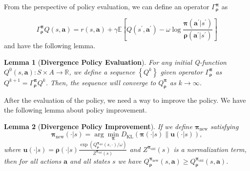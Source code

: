 \documentclass{article}
\newtheorem{lemma}{Lemma}
\begin{document}
From the perspective of policy evaluation, we can define an operator $\Gamma^{\operatorname{\bm{\pi}}}_{\operatorname{\bm{\rho}}}$ as
\iffalse
\begin{equation*}
	\Gamma^{\operatorname{\bm{\pi}}}_{\operatorname{\bm{\rho}}} Q(s,\bm{a}) = r(s,\bm{a}) + \gamma \mathbb{E}_{s^{\prime} \sim P(\cdot | s, \bm{a}), \bm{a^{\prime}} \sim  \bm{\pi}(\cdot | s^{\prime}) } \left[ Q(s^{\prime},\bm{a^{\prime}}) - \omega \log \frac{{\bm{\pi}}(\bm{a^{\prime}}|s^{\prime})}{{\bm{\rho}}(\bm{a^{\prime}}|s^{\prime})} \right]
\end{equation*}
\fi
\begin{equation*}
	\Gamma^{\operatorname{\bm{\pi}}}_{\operatorname{\bm{\rho}}} Q(s,\bm{a}) = r(s,\bm{a}) + \gamma \mathbb{E} \left[ Q(s^{\prime},\bm{a^{\prime}}) - \omega \log \frac{{\bm{\pi}}(\bm{a^{\prime}}|s^{\prime})}{{\bm{\rho}}(\bm{a^{\prime}}|s^{\prime})} \right]
\end{equation*}
and have the following lemma. 

\begin{lemma}[{\bf Divergence Policy Evaluation}] \label{policy_evaluation}
	For any initial Q-function $Q^{0}(s,\bm{a}): S \times A \to \mathbb{R} $, we define a sequence $\left\{ Q^{k} \right\}$ given operator $\Gamma^{\operatorname{\bm{\pi}}}_{\operatorname{\bm{\rho}}}$ as 
	$
	Q^{k +1} = \Gamma^{\operatorname{\bm{\pi}}}_{\operatorname{\bm{\rho}}} Q^{k}
	$.
	Then, the sequence will converge to $Q_{\bm{\rho}}^{\bm{\pi}}$ as $k \to \infty$.
\end{lemma}

After the evaluation of the policy, we need a way to improve the policy. We have the following lemma about policy improvement.

\begin{lemma}[{\bf Divergence Policy Improvement}] \label{policy-theorem}
	If we define ${\bm{\pi}}_{\operatorname{new}}$ satisfying
	\begin{equation}\label{eq:lemma2}
		{\bm{\pi}}_{\operatorname{new}}(\cdot|s) = \arg \min_{\bm{\pi}} D_{\operatorname{KL}}\left( {\bm{\pi}}(\cdot|s) \| \bm{u}(\cdot|s) \right),
	\end{equation}
	where $\bm{u}(\cdot|s) = {\bm{\rho}}(\cdot|s) \frac{\exp\left( Q^{{\bm{\pi}}_{\operatorname{old}}}_{\bm{\rho}}(s,\cdot) / \omega \right)}{Z^{{\bm{\pi}}_{\operatorname{old}}}(s)}$ and $Z^{{\bm{\pi}}_{\operatorname{old}}}(s)$ is a normalization term, then for all actions $\bm{a}$ and all states $s$ we have
	$Q^{{\bm{\pi}}_{\operatorname{new}}}_{\bm{\rho}}(s,\bm{a}) \geq Q^{{\bm{\pi}}_{\operatorname{old}}}_{\bm{\rho}}(s,\bm{a})$.
\end{lemma}
\end{document}
